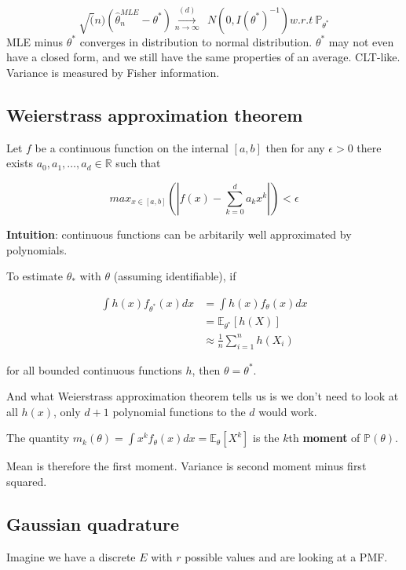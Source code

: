 \documentclass{article}
\begin{document}
$$
\sqrt(n) (\hat{\theta}^{MLE}_{n} - \theta^*) \overset{(d)}{\underset{n \to \infty}{\longrightarrow}} ~ ~ \mathit{N}(0, I(\theta^*)^{-1}) w.r.t ~ \mathbb{P}_{\theta^*}
$$
MLE minus $\theta^*$ converges in distribution to normal distribution. $\theta^*$ may not even have a closed form, and we still have the same properties of an average. CLT-like.
Variance is measured by Fisher information.


\subsection{Weierstrass approximation theorem}

Let $f$ be a continuous function on the internal $[a, b]$ then for any $\epsilon > 0$ there exists $a_0, a_1, \dots, a_d \in \mathbb{R}$ such that

$$
max_{x \in [a, b]}(|f(x) - \sum_{k = 0}^{d}{a_k x^k}|) < \epsilon
$$

\textbf{Intuition}: continuous functions can be arbitarily well approximated by polynomials.

To estimate $\theta_*$ with $\theta$ (assuming identifiable), if

\begin{align*}
\int h(x) f_{\theta^*}(x) dx &= \int h(x) f_{\theta}(x) dx \\
                             &= \mathbb{E}_{\theta^*}[h(X)] \\
                             &\approx \frac{1}{n} \sum_{i=1}^{n} h(X_i)
\end{align*}

for all bounded continuous functions $h$, then $\theta = \theta^*$.

And what Weierstrass approximation theorem tells us is we don't need to look at all $h(x)$, only $d + 1$ polynomial functions to the $d$ would work.

The quantity $m_{k}(\theta) = \int x^k f_{\theta}(x) dx = \mathbb{E}_{\theta}[X^k]$ is the $k$th \textbf{moment} of $\mathbb{P}(\theta)$.

Mean is therefore the first moment. Variance is second moment minus first squared.

\subsection{Gaussian quadrature}

Imagine we have a discrete $E$ with $r$ possible values and are looking at a PMF.
\end{document}
